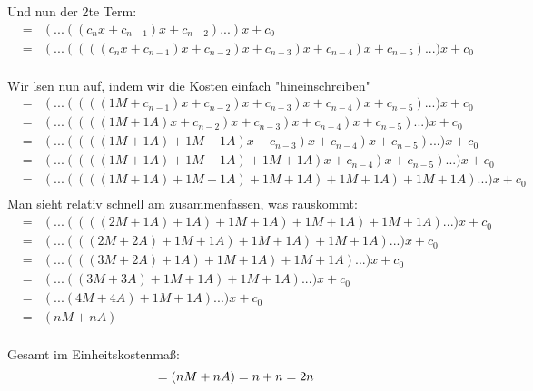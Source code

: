 \newpage

Und nun der 2te Term:
\begin{eqnarray*}
&=& (... ((c_{n}x + c_{n - 1})x + c_{n - 2}) ...)x + c_0\\
&=& (... ((((c_{n}x + c_{n - 1})x + c_{n - 2})x + c_{n - 3})x + c_{n - 4})x + c_{n - 5}) ...)x + c_0\\
\end{eqnarray*}

Wir l\ouml sen nun auf, indem wir die Kosten einfach "hineinschreiben"
\begin{eqnarray*}
&=& (... ((((1M + c_{n - 1})x + c_{n - 2})x + c_{n - 3})x + c_{n - 4})x + c_{n - 5}) ...)x + c_0\\
&=& (... ((((1M + 1A)x + c_{n - 2})x + c_{n - 3})x + c_{n - 4})x + c_{n - 5}) ...)x + c_0\\
&=& (... ((((1M + 1A) + 1M + 1A)x + c_{n - 3})x + c_{n - 4})x + c_{n - 5}) ...)x + c_0\\
&=& (... ((((1M + 1A) + 1M + 1A) +1M + 1A)x + c_{n - 4})x + c_{n - 5}) ...)x + c_0\\
&=& (... ((((1M + 1A) + 1M + 1A) +1M + 1A) + 1M + 1A) +1M + 1A) ...)x + c_0\\
\end{eqnarray*}
Man sieht relativ schnell am zusammenfassen, was rauskommt:
\begin{eqnarray*}
&=& (... ((((2M + 1A) + 1A) +1M + 1A) + 1M + 1A) +1M + 1A) ...)x + c_0\\
&=& (... (((2M + 2A) +1M + 1A) + 1M + 1A) +1M + 1A) ...)x + c_0\\
&=& (... (((3M + 2A) + 1A) + 1M + 1A) +1M + 1A) ...)x + c_0\\
&=& (... ((3M + 3A) + 1M + 1A) +1M + 1A) ...)x + c_0\\
&=& (... (4M + 4A) +1M + 1A) ...)x + c_0\\
&=& (nM + nA)\\
\end{eqnarray*}


Gesamt im Einheitskostenma\ss:\\
\begin{equation*}
= (nM + nA) = n + n = 2n\\
\end{equation*}
  


